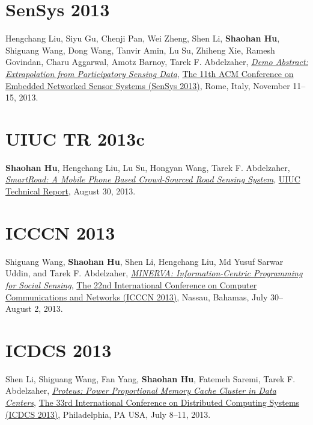 \section{\sc SenSys 2013}\hypertarget{liu2013sensys}{}
Hengchang Liu, Siyu Gu, Chenji Pan, Wei Zheng, Shen Li, \textbf{Shaohan Hu}, Shiguang Wang, Dong Wang, Tanvir Amin, Lu Su, Zhiheng Xie, Ramesh Govindan, Charu Aggarwal, Amotz Barnoy, Tarek F. Abdelzaher,
\href{http://portal.acm.org/citation.cfm?id=2517431}{\emph{Demo Abstract: Extrapolation from Participatory Sensing Data}},
\href{http://sensys.acm.org/2013/}{\textsf{The 11th ACM Conference on Embedded Networked Sensor Systems (SenSys 2013)}},
Rome, Italy, November 11--15, 2013.

\section{\sc UIUC TR 2013c}\hypertarget{hu2013uiuc2}{}
\textbf{Shaohan Hu}, Hengchang Liu, Lu Su, Hongyan Wang, Tarek F. Abdelzaher,
\href{https://www.ideals.illinois.edu/handle/2142/45699}{\emph{SmartRoad: A Mobile Phone Based Crowd-Sourced Road Sensing System}},
\href{http://www.ideals.illinois.edu}{\textsf{UIUC Technical Report}},
August 30, 2013.

\section{\sc ICCCN 2013}\hypertarget{wang2013icccn}{}
Shiguang Wang, \textbf{Shaohan Hu}, Shen Li, Hengchang Liu, Md Yusuf Sarwar Uddin, and Tarek F. Abdelzaher,
\href{http://ieeexplore.ieee.org/xpls/abs_all.jsp?arnumber=6614152}{\emph{MINERVA: Information-Centric Programming for Social Sensing}},
\href{http://www.icccn.org/icccn13/}{\textsf{The 22nd International Conference on Computer Communications and Networks (ICCCN 2013)}},
Nassau, Bahamas, July 30--August 2, 2013.

\section{\sc ICDCS 2013}\hypertarget{li2013icdcs}{}
Shen Li, Shiguang Wang, Fan Yang, \textbf{Shaohan Hu}, Fatemeh Saremi, Tarek F. Abdelzaher,
\href{http://ieeexplore.ieee.org/xpl/articleDetails.jsp?arnumber=6681577}{\emph{Proteus: Power Proportional Memory Cache Cluster in Data Centers}},
\href{http://www.temple.edu/cis/icdcs2013/}{\textsf{The 33rd International Conference on Distributed Computing Systems (ICDCS 2013)}},
Philadelphia, PA USA, July 8--11, 2013.

